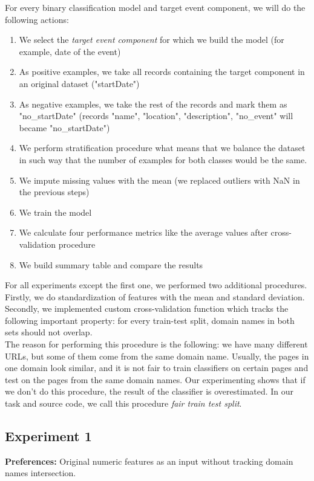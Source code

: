For every binary classification model and target event component, we will do the following actions: 
\begin{enumerate}
    \item We select the \textit{target event component} for which we build the model (for example, date of the event)
    \item As positive examples, we take all records containing the target component in an original dataset ("startDate")
    \item As negative examples, we take the rest of the records
    and mark them as "no\_startDate" (records "name", "location", "description", "no\_event" will became "no\_startDate")
    \item We perform stratification procedure what means that we balance the dataset in such way that the number of examples for both classes would be the same.
    \item We impute missing values with the mean (we replaced outliers with NaN in the previous steps)
    \item We train the model
    \item We calculate four performance metrics like the average values after cross-validation procedure
    \item We build summary table and compare the results 
\end{enumerate}

For all experiments except the first one, we performed two additional procedures. Firstly, we do standardization of features with the mean and standard deviation. Secondly, we implemented custom cross-validation function which tracks the following important property: for every train-test split, domain names in both sets should not overlap. \\

The reason for performing this procedure is the following: we have many different URLs, but some of them come from the same domain name. Usually, the pages in one domain look similar, and it is not fair to train classifiers on certain pages and test on the pages from the same domain names. Our experimenting shows that if we don't do this procedure, the result of the classifier is overestimated. In our task and source code, we call this procedure \textit{fair train test split}.\\

\subsection{Experiment 1}
\noindent\textbf{Preferences:} Original numeric features as an input without tracking domain names intersection. \\

